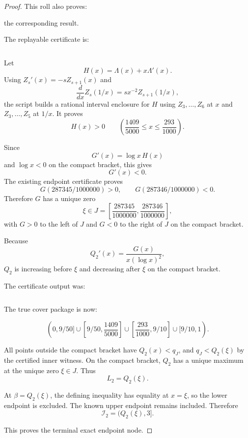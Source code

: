 \begin{proof}
This roll also proves:

the corresponding result.

The replayable certificate is:

\begin{verbatim}
\end{verbatim}

Let
\[
H(x)=\Lambda(x)+x\Lambda'(x).
\]
Using \(Z_s'(x)=-sZ_{s+1}(x)\) and
\[
\frac{d}{dx}Z_s(1/x)=s x^{-2} Z_{s+1}(1/x),
\]
the script builds a rational interval enclosure for \(H\) using \(Z_3,\ldots,Z_6\) at \(x\) and \(Z_3,\ldots,Z_5\) at \(1/x\). It proves
\[
H(x)>0
\qquad
\left(\frac{1409}{5000}\le x\le\frac{293}{1000}\right).
\]

Since
\[
G'(x)=\log x\,H(x)
\]
and \(\log x<0\) on the compact bracket, this gives
\[
G'(x)<0.
\]
The existing endpoint certificate proves
\[
G(287345/1000000)>0,
\qquad
G(287346/1000000)<0.
\]
Therefore \(G\) has a unique zero
\[
\xi\in J=\left[\frac{287345}{1000000},\frac{287346}{1000000}\right],
\]
with \(G>0\) to the left of \(J\) and \(G<0\) to the right of \(J\) on the compact bracket.

Because
\[
Q_2'(x)=\frac{G(x)}{x(\log x)^2},
\]
\(Q_2\) is increasing before \(\xi\) and decreasing after \(\xi\) on the compact bracket.

The certificate output was:

\begin{verbatim}
\end{verbatim}

The true cover package is now:

\[
(0,9/50]\cup
\left[9/50,\frac{1409}{5000}\right]\cup
\left[\frac{293}{1000},9/10\right]\cup
[9/10,1).
\]

All points outside the compact bracket have \(Q_2(x)<q_J\), and \(q_J<Q_2(\xi)\) by the certified inner witness. On the compact bracket, \(Q_2\) has a unique maximum at the unique zero \(\xi\in J\). Thus
\[
L_2=Q_2(\xi).
\]

At \(\beta=Q_2(\xi)\), the defining inequality has equality at \(x=\xi\), so the lower endpoint is excluded. The known upper endpoint remains included. Therefore
\[
\mathcal I_2=(Q_2(\xi),3].
\]

This proves the terminal exact endpoint node.
\end{proof}


